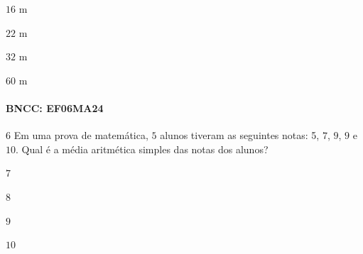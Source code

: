 {\begin{escolha}
\item $16$ m
\item $22$ m
\item $32$ m
\item $60$ m
\end{escolha}

\paragraph{BNCC: EF06MA24 }


\num{6}  Em uma prova de matemática, $5$ alunos tiveram as seguintes notas: 5, $7$, $9$, $9$ e $10$. Qual é a média aritmética simples das notas dos alunos?

\begin{escolha}
\item $7$
\item $8$
\item $9$
\item $10$
\end{escolha}



}
